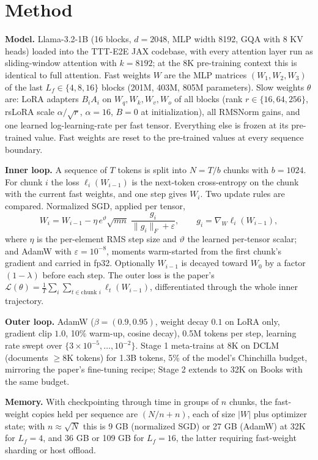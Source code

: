 \documentclass[10pt]{article}
\begin{document}
\section{Method}
\textbf{Model.} Llama-3.2-1B (16 blocks, $d{=}2048$, MLP width 8192, GQA with 8 KV heads) loaded into the TTT-E2E JAX codebase, with every attention layer run as sliding-window attention with $k{=}8192$; at the 8K pre-training context this is identical to full attention. Fast weights $W$ are the MLP matrices $(W_1,W_2,W_3)$ of the last $L_f\in\{4,8,16\}$ blocks (201M, 403M, 805M parameters). Slow weights $\theta$ are: LoRA adapters $B_iA_i$ on $W_q,W_k,W_v,W_o$ of all blocks (rank $r\in\{16,64,256\}$, rsLoRA scale $\alpha/\sqrt r$, $\alpha{=}16$, $B{=}0$ at initialization), all RMSNorm gains, and one learned log-learning-rate per fast tensor. Everything else is frozen at its pre-trained value. Fast weights are reset to the pre-trained values at every sequence boundary.

\textbf{Inner loop.} A sequence of $T$ tokens is split into $N{=}T/b$ chunks with $b{=}1024$. For chunk $i$ the loss $\ell_i(W_{i-1})$ is the next-token cross-entropy on the chunk with the current fast weights, and one step gives $W_i$. Two update rules are compared. Normalized SGD, applied per tensor,
\[
W_i = W_{i-1} - \eta\, e^{\vartheta}\sqrt{mn}\;\frac{g_i}{\|g_i\|_F+\varepsilon},\qquad g_i=\nabla_W \ell_i(W_{i-1}),
\]
where $\eta$ is the per-element RMS step size and $\vartheta$ the learned per-tensor scalar; and AdamW with $\varepsilon{=}10^{-8}$, moments warm-started from the first chunk's gradient and carried in fp32. Optionally $W_{i-1}$ is decayed toward $W_0$ by a factor $(1-\lambda)$ before each step. The outer loss is the paper's $\mathcal L(\theta)=\frac1T\sum_i \sum_{t\in\text{chunk }i}\ell_t(W_{i-1})$, differentiated through the whole inner trajectory.

\textbf{Outer loop.} AdamW ($\beta{=}(0.9,0.95)$, weight decay $0.1$ on LoRA only, gradient clip $1.0$, 10\% warm-up, cosine decay), 0.5M tokens per step, learning rate swept over $\{3\times10^{-5},\dots,10^{-2}\}$. Stage 1 meta-trains at 8K on DCLM (documents $\ge$8K tokens) for 1.3B tokens, 5\% of the model's Chinchilla budget, mirroring the paper's fine-tuning recipe; Stage 2 extends to 32K on Books with the same budget.

\textbf{Memory.} With checkpointing through time in groups of $n$ chunks, the fast-weight copies held per sequence are $(N/n+n)$, each of size $|W|$ plus optimizer state; with $n\approx\sqrt N$ this is 9 GB (normalized SGD) or 27 GB (AdamW) at 32K for $L_f{=}4$, and 36 GB or 109 GB for $L_f{=}16$, the latter requiring fast-weight sharding or host offload.
\end{document}
